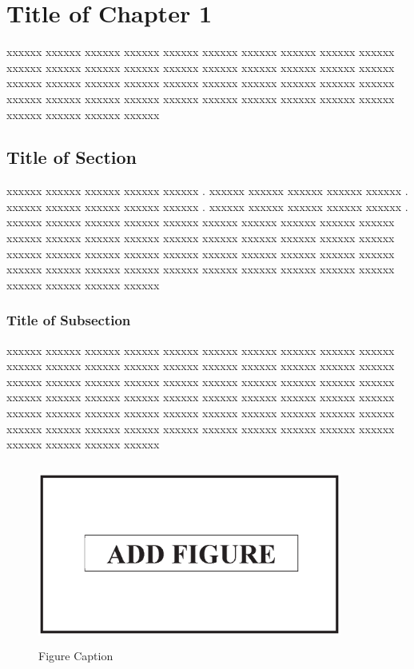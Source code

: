 
\chapter{Title of Chapter 1}
\graphicspath{{Chapter_1/Vector/}{Chapter_1/}}

xxxxxx xxxxxx xxxxxx xxxxxx xxxxxx xxxxxx xxxxxx xxxxxx xxxxxx xxxxxx xxxxxx xxxxxx xxxxxx xxxxxx xxxxxx xxxxxx xxxxxx xxxxxx xxxxxx xxxxxx xxxxxx xxxxxx xxxxxx xxxxxx xxxxxx xxxxxx xxxxxx xxxxxx xxxxxx xxxxxx xxxxxx xxxxxx xxxxxx xxxxxx xxxxxx xxxxxx xxxxxx xxxxxx xxxxxx xxxxxx xxxxxx xxxxxx xxxxxx xxxxxx 

\section{Title of Section}

xxxxxx xxxxxx xxxxxx xxxxxx xxxxxx \cite{ErdelyiBook}. xxxxxx xxxxxx xxxxxx xxxxxx xxxxxx \cite{ErdelyiBook}. xxxxxx xxxxxx xxxxxx xxxxxx xxxxxx \cite{	JakesBook}. xxxxxx xxxxxx xxxxxx xxxxxx xxxxxx \cite{	ExtonBook}. xxxxxx xxxxxx xxxxxx xxxxxx xxxxxx xxxxxx xxxxxx xxxxxx xxxxxx xxxxxx xxxxxx xxxxxx xxxxxx xxxxxx xxxxxx xxxxxx xxxxxx xxxxxx xxxxxx xxxxxx xxxxxx xxxxxx xxxxxx xxxxxx xxxxxx xxxxxx xxxxxx xxxxxx xxxxxx xxxxxx xxxxxx xxxxxx xxxxxx xxxxxx xxxxxx xxxxxx xxxxxx xxxxxx xxxxxx xxxxxx xxxxxx xxxxxx xxxxxx xxxxxx 

\subsection{Title of Subsection}

xxxxxx xxxxxx xxxxxx xxxxxx \cite{	SrivastavaBook}xxxxxx xxxxxx xxxxxx xxxxxx \cite{	PrudnikovBookv4}xxxxxx xxxxxx xxxxxx xxxxxx \cite{	LeeBook1998}	xxxxxx xxxxxx xxxxxx xxxxxx \cite{	RyzhikBook}xxxxxx xxxxxx xxxxxx xxxxxx xxxxxx xxxxxx xxxxxx xxxxxx \cite{	HoytApr1947} xxxxxx xxxxxx xxxxxx xxxxxx xxxxxx xxxxxx xxxxxx xxxxxx xxxxxx xxxxxx xxxxxx xxxxxx xxxxxx xxxxxx xxxxxx xxxxxx xxxxxx xxxxxx xxxxxx xxxxxx xxxxxx xxxxxx xxxxxx xxxxxx xxxxxx xxxxxx xxxxxx xxxxxx xxxxxx xxxxxx xxxxxx xxxxxx xxxxxx xxxxxx xxxxxx xxxxxx xxxxxx xxxxxx xxxxxx xxxxxx 



\begin{figure}
	\centering
	\includegraphics[width=10cm,height=6cm]{Figure.eps}
	\caption{Figure Caption}
	\label{a}
\end{figure}




